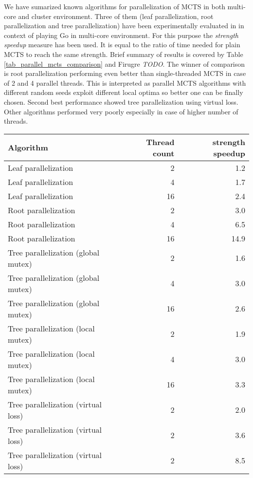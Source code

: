 We have sumarized known algorithms for parallelization of MCTS in both multi-core and cluster
environment. Three of them (leaf parallelization, root parallelization and tree
parallelization)
have been experimentally evaluated in \cite{Chaslot2008} in context of playing Go in multi-core
environment. For this purpose the \emph{strength speedup} measure has been used. It is equal to
 the ratio of time needed for plain
MCTS to reach the same strength. Brief summary of results is covered by Table
\ref{tab_parallel_mcts_comparison} and Firugre \emph{TODO}. The winner of comparison is root parallelization performing even
better than single-threaded MCTS in case of 2 and 4 parallel threads. This is interpreted as 
parallel MCTS algorithms with different random seeds exploit different local optima so better one
can be finally chosen. Second best performance showed tree parallelization using virtual loss. Other
algorithms performed very poorly especially in case of higher number of threads.


\begin{table}[h]
\begin{center}
\begin{tabular}{lrr}
\hline
Algorithm & Thread count & strength speedup\\
\hline
Leaf parallelization & 2  & 1.2\\
Leaf parallelization & 4  & 1.7\\
Leaf parallelization & 16 & 2.4\\
\hline
Root parallelization & 2  & 3.0\\
Root parallelization & 4  & 6.5\\
Root parallelization & 16 & 14.9\\
\hline
Tree parallelization (global mutex) & 2  & 1.6\\
Tree parallelization (global mutex) & 4  & 3.0\\
Tree parallelization (global mutex) & 16 & 2.6\\
\hline
Tree parallelization (local mutex) & 2  & 1.9\\
Tree parallelization (local mutex) & 4  & 3.0\\
Tree parallelization (local mutex) & 16 & 3.3\\
\hline
Tree parallelization (virtual loss) & 2  & 2.0\\
Tree parallelization (virtual loss) & 2  & 3.6\\
Tree parallelization (virtual loss) & 2  & 8.5\\
\hline
\end{tabular}
\end{center}
\end{table}









